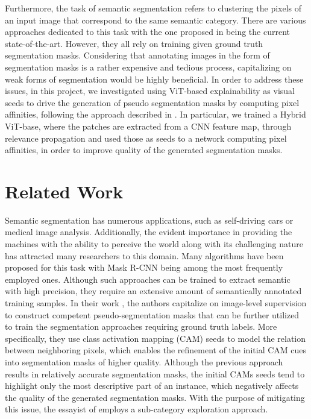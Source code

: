 \documentclass{article}
\begin{document}
Furthermore, the task of semantic segmentation refers to clustering the pixels of an input image that correspond to the same semantic category. There are various approaches dedicated to this task with the one proposed in \cite{panoptic} being the current state-of-the-art. However, they all rely on training given ground truth segmentation masks. Considering that annotating images in the form of segmentation masks is a rather expensive and tedious process, capitalizing on weak forms of segmentation would be highly beneficial. In order to address these issues, in this project, we investigated using ViT-based explainability as visual seeds to drive the generation of pseudo segmentation masks by computing pixel affinities, following the approach described in \cite{ahn2018learning}. In particular, we trained a Hybrid ViT-base, where the patches are extracted from a CNN feature map, through relevance propagation and used those as seeds to a network computing pixel affinities, in order to improve quality of the generated segmentation masks. 

\section{Related Work}
Semantic segmentation has numerous applications, such as self-driving cars or medical image analysis.  Additionally, the evident importance in providing the machines with the ability to perceive the world along with its challenging nature has attracted many researchers to this domain. Many algorithms have been proposed for this task with Mask R-CNN \cite{he2017mask} being among the most frequently employed ones. Although such  approaches can be trained to extract semantic with high precision, they require an extensive amount of semantically annotated training samples. In their work \cite{ahn2018learning}, the authors capitalize on image-level supervision to construct competent pseudo-segmentation masks that can be further utilized to train the segmentation approaches requiring ground truth labels. More specifically, they use class activation mapping (CAM) \cite{zhou2016learning} seeds to model the relation between neighboring pixels, which enables the refinement of the initial CAM cues into segmentation masks of higher quality. Although the previous approach results in relatively accurate segmentation masks, the initial CAMs seeds tend to highlight only the most descriptive part of an instance, which negatively affects the quality of the generated segmentation masks. With the purpose of mitigating this issue, the essayist of \cite{chang2020weakly} employs a sub-category exploration approach. 
\end{document}
